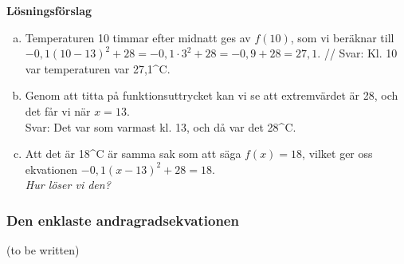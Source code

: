 \textbf{Lösningsförslag}
\begin{enumerate}[(a)]
  \item Temperaturen 10 timmar efter midnatt ges av $f(10)$, som vi beräknar till $-0,1(10-13)^2+28 = -0,1 \cdot 3^2 + 28 = -0,9+28 = 27,1$. //
  Svar: Kl. 10 var temperaturen var 27,1^{\circ}C.
  \item Genom att titta på funktionsuttrycket kan vi se att extremvärdet är 28, och det får vi när $x=13$. \\
  Svar: Det var som varmast kl. 13, och då var det 28^{\circ}C.
  \item Att det är 18^{\circ}C är samma sak som att säga $f(x)=18$, vilket ger oss ekvationen $-0,1(x-13)^2+28=18$. \\
  \emph{Hur löser vi den?}
\end{enumerate}

\subsubsection{Den enklaste andragradsekvationen}

(to be written)
